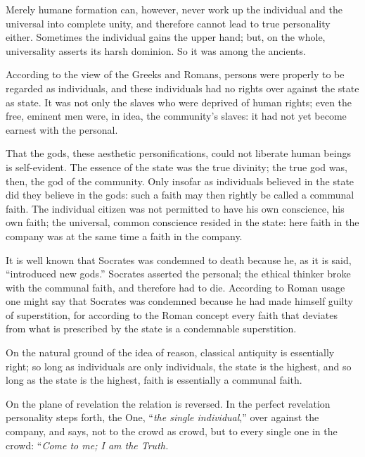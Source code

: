 \documentclass[12pt,a4paper]{book}
\begin{document}
Merely humane formation can, however, never work up the individual and the universal into complete unity, and therefore cannot lead to true personality either. Sometimes the individual gains the upper hand; but, on the whole, universality asserts its harsh dominion. So it was among the ancients.

According to the view of the Greeks and Romans, persons were properly to be regarded as individuals, and these individuals had no rights over against the state as state. It was not only the slaves who were deprived of human rights; even the free, eminent men were, in idea, the community's slaves: it had not yet become earnest with the personal.

That the gods, these aesthetic personifications, could not liberate human beings is self-evident. The essence of the state was the true divinity; the true god was, then, the god of the community. Only insofar as individuals believed in the state did they believe in the gods: such a faith may then rightly be
called a communal faith. The individual citizen was not permitted to have his own conscience, his own faith; the universal, common conscience resided in the state: here faith in the company was at the same time a faith in the company.

It is well known that Socrates was condemned to death because he, as it is said, ``introduced new gods.'' Socrates asserted the personal; the ethical thinker broke with the communal faith, and therefore had to die. According to Roman usage one might say that Socrates was condemned because he had made himself guilty of superstition, for according to the Roman concept every faith that deviates from what is prescribed by the state is a condemnable superstition.

On the natural ground of the idea of reason, classical antiquity is essentially right; so long as individuals are only individuals, the state is the highest, and so long as the state is the highest, faith is essentially a communal faith.

On the plane of revelation the relation is reversed. In the perfect revelation personality steps forth, the One, ``\emph{the single individual},'' over against the company, and says, not to the crowd as crowd, but to every single one in the crowd: ``\emph{Come to me; I am the Truth.}
\end{document}
